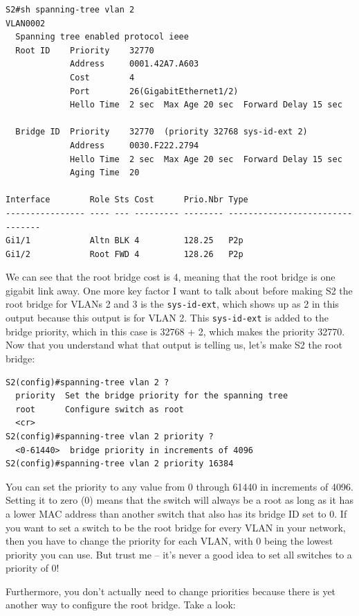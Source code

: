 \documentclass[b5paper,11pt]{memoir}
\begin{document}
\begin{verbatim}
S2#sh spanning-tree vlan 2
VLAN0002
  Spanning tree enabled protocol ieee
  Root ID    Priority    32770
             Address     0001.42A7.A603
             Cost        4
             Port        26(GigabitEthernet1/2)
             Hello Time  2 sec  Max Age 20 sec  Forward Delay 15 sec
 
  Bridge ID  Priority    32770  (priority 32768 sys-id-ext 2)
             Address     0030.F222.2794
             Hello Time  2 sec  Max Age 20 sec  Forward Delay 15 sec
             Aging Time  20
 
Interface        Role Sts Cost      Prio.Nbr Type
---------------- ---- --- --------- -------- --------------------------------
Gi1/1            Altn BLK 4         128.25   P2p
Gi1/2            Root FWD 4         128.26   P2p
\end{verbatim}

We can see that the root bridge cost is 4, meaning that the root bridge
is one gigabit link away. One more key factor I want to talk about
before making S2 the root bridge for VLANs 2 and 3 is the
\texttt{sys-id-ext}, which shows up as 2 in this output because this
output is for VLAN 2. This \texttt{sys-id-ext} is added to the bridge
priority, which in this case is 32768 + 2, which makes the priority
32770. Now that you understand what that output is telling us, let's
make S2 the root bridge:

\begin{verbatim}
S2(config)#spanning-tree vlan 2 ?
  priority  Set the bridge priority for the spanning tree
  root      Configure switch as root
  <cr>
S2(config)#spanning-tree vlan 2 priority ?
  <0-61440>  bridge priority in increments of 4096
S2(config)#spanning-tree vlan 2 priority 16384
\end{verbatim}

You can set the priority to any value from 0 through 61440 in increments
of 4096. Setting it to zero (0) means that the switch will always be a
root as long as it has a lower MAC address than another switch that also
has its bridge ID set to 0. If you want to set a switch to be the root
bridge for every VLAN in your network, then you have to change the
priority for each VLAN, with 0 being the lowest priority you can use.
But trust me -- it's never a good idea to set all switches to a priority
of 0!

Furthermore, you don't actually need to change priorities because there
is yet another way to configure the root bridge. Take a look:
\end{document}
